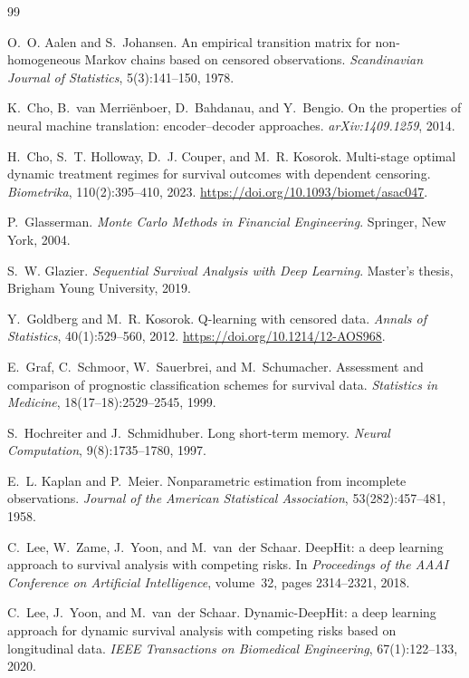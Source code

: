\begin{thebibliography}{99}
\small

O.~O. Aalen and S.~Johansen.
An empirical transition matrix for non-homogeneous Markov chains based on
censored observations.
\emph{Scandinavian Journal of Statistics}, 5(3):141--150, 1978.

K.~Cho, B.~van Merri\"{e}nboer, D.~Bahdanau, and Y.~Bengio.
On the properties of neural machine translation: encoder--decoder approaches.
\emph{arXiv:1409.1259}, 2014.

H.~Cho, S.~T. Holloway, D.~J. Couper, and M.~R. Kosorok.
Multi-stage optimal dynamic treatment regimes for survival outcomes with dependent censoring.
\emph{Biometrika}, 110(2):395--410, 2023.
\url{https://doi.org/10.1093/biomet/asac047}.

P.~Glasserman.
\emph{Monte Carlo Methods in Financial Engineering}.
Springer, New York, 2004.

S.~W. Glazier.
\emph{Sequential Survival Analysis with Deep Learning}.
Master's thesis, Brigham Young University, 2019.

Y.~Goldberg and M.~R. Kosorok.
Q-learning with censored data.
\emph{Annals of Statistics}, 40(1):529--560, 2012.
\url{https://doi.org/10.1214/12-AOS968}.

E.~Graf, C.~Schmoor, W.~Sauerbrei, and M.~Schumacher.
Assessment and comparison of prognostic classification schemes for survival
data.
\emph{Statistics in Medicine}, 18(17--18):2529--2545, 1999.

S.~Hochreiter and J.~Schmidhuber.
Long short-term memory.
\emph{Neural Computation}, 9(8):1735--1780, 1997.

E.~L. Kaplan and P.~Meier.
Nonparametric estimation from incomplete observations.
\emph{Journal of the American Statistical Association}, 53(282):457--481, 1958.

C.~Lee, W.~Zame, J.~Yoon, and M.~van~der Schaar.
DeepHit: a deep learning approach to survival analysis with competing risks.
In \emph{Proceedings of the AAAI Conference on Artificial Intelligence},
volume~32, pages 2314--2321, 2018.

C.~Lee, J.~Yoon, and M.~van~der Schaar.
Dynamic-DeepHit: a deep learning approach for dynamic survival analysis with
competing risks based on longitudinal data.
\emph{IEEE Transactions on Biomedical Engineering}, 67(1):122--133, 2020.


\end{thebibliography}
